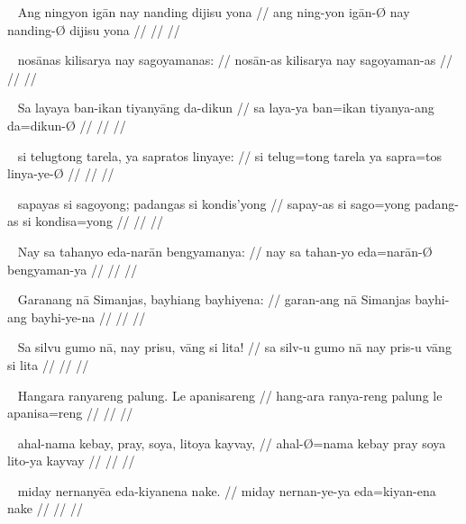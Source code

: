 \ex~\begingl
	\gla Ang ningyon igān nay nanding dijisu yona //
	\glb ang ning-yon igān-Ø nay nanding-Ø dijisu yona //
	\glc  //
	\glft  //
\endgl\xe

\ex~\begingl
	\gla nosānas kilisarya nay sagoyamanas: //
	\glb nosān-as kilisarya nay sagoyaman-as //
	\glc  //
	\glft  //
\endgl\xe

\ex~\begingl
	\gla Sa layaya ban-ikan tiyanyāng da-dikun //
	\glb sa laya-ya ban=ikan tiyanya-ang da=dikun-Ø //
	\glc  //
	\glft  //
\endgl\xe

\ex~\begingl
	\gla si telugtong tarela, ya sapratos linyaye: //
	\glb si telug=tong tarela ya sapra=tos linya-ye-Ø //
	\glc  //
	\glft  //
\endgl\xe

\ex~\begingl
	\gla sapayas si sagoyong; padangas si kondis'yong //
	\glb sapay-as si sago=yong padang-as si kondisa=yong //
	\glc  //
	\glft  //
\endgl\xe

\ex~\begingl
	\gla Nay sa tahanyo eda-narān bengyamanya: //
	\glb nay sa tahan-yo eda=narān-Ø bengyaman-ya //
	\glc  //
	\glft  //
\endgl\xe

\ex~\begingl
	\gla Garanang nā Simanjas, bayhiang bayhiyena: //
	\glb garan-ang nā Simanjas bayhi-ang bayhi-ye-na //
	\glc  //
	\glft  //
\endgl\xe

\ex~\begingl
	\gla Sa silvu gumo nā, nay prisu, vāng si lita! //
	\glb sa silv-u gumo nā nay pris-u vāng si lita //
	\glc  //
	\glft  //
\endgl\xe

\ex~\begingl
	\gla Hangara ranyareng palung. Le apanisareng //
	\glb hang-ara ranya-reng palung le apanisa=reng //
	\glc  //
	\glft  //
\endgl\xe

\ex~\begingl
	\gla ahal-nama kebay, pray, soya, litoya kayvay, //
	\glb ahal-Ø=nama kebay pray soya lito-ya kayvay //
	\glc  //
	\glft  //
\endgl\xe

\ex~\begingl
	\gla miday nernanyēa eda-kiyanena nake. //
	\glb miday nernan-ye-ya eda=kiyan-ena nake //
	\glc  //
	\glft  //
\endgl\xe
